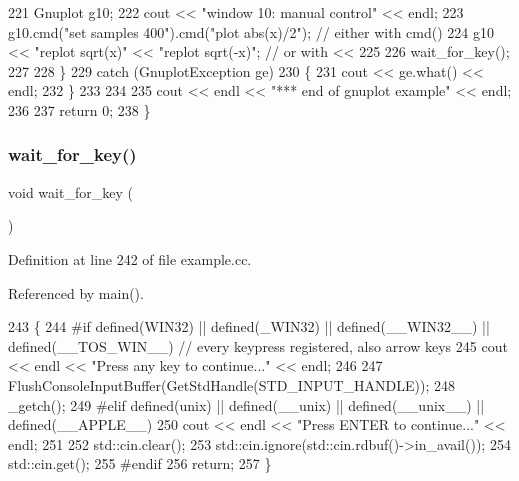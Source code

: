 \begin{DoxyCode}
221         Gnuplot g10;
222         cout << \textcolor{stringliteral}{"window 10: manual control"} << endl;
223         g10.cmd(\textcolor{stringliteral}{"set samples 400"}).cmd(\textcolor{stringliteral}{"plot abs(x)/2"}); \textcolor{comment}{// either with cmd()}
224         g10 << \textcolor{stringliteral}{"replot sqrt(x)"} << \textcolor{stringliteral}{"replot sqrt(-x)"};    \textcolor{comment}{// or with <<}
225 
226         wait_for_key();
227 
228     \}
229     \textcolor{keywordflow}{catch} (GnuplotException ge)
230     \{
231         cout << ge.what() << endl;
232     \}
233 
234 
235     cout << endl << \textcolor{stringliteral}{"*** end of gnuplot example"} << endl;
236 
237     \textcolor{keywordflow}{return} 0;
238 \}
\end{DoxyCode}
\mbox{\label{example_8cc_a621288a08ecc9633729935737256e831}} 
\subsubsection{wait\+\_\+for\+\_\+key()}
{\footnotesize\ttfamily void wait\+\_\+for\+\_\+key (\begin{DoxyParamCaption}{ }\end{DoxyParamCaption})}



Definition at line 242 of file example.\+cc.



Referenced by main().


\begin{DoxyCode}
243 \{
244 \textcolor{preprocessor}{#if defined(WIN32) || defined(\_WIN32) || defined(\_\_WIN32\_\_) || defined(\_\_TOS\_WIN\_\_)  // every keypress
       registered, also arrow keys}
245     cout << endl << \textcolor{stringliteral}{"Press any key to continue..."} << endl;
246 
247     FlushConsoleInputBuffer(GetStdHandle(STD\_INPUT\_HANDLE));
248     \_getch();
249 \textcolor{preprocessor}{#elif defined(unix) || defined(\_\_unix) || defined(\_\_unix\_\_) || defined(\_\_APPLE\_\_)}
250     cout << endl << \textcolor{stringliteral}{"Press ENTER to continue..."} << endl;
251 
252     std::cin.clear();
253     std::cin.ignore(std::cin.rdbuf()->in\_avail());
254     std::cin.get();
255 \textcolor{preprocessor}{#endif}
256     \textcolor{keywordflow}{return};
257 \}
\end{DoxyCode}
